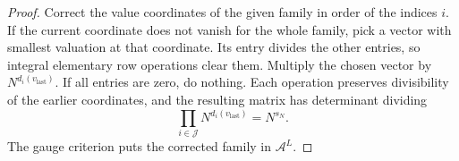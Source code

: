 \begin{proof}
Correct the value coordinates of the given family in order of the indices $i$. If the current coordinate does not vanish for the whole family, pick a vector with smallest valuation at that coordinate. Its entry divides the other entries, so integral elementary row operations clear them. Multiply the chosen vector by $N^{d_i(v_{\mathrm{last}})}$. If all entries are zero, do nothing. Each operation preserves divisibility of the earlier coordinates, and the resulting matrix has determinant dividing
\[
 \prod_{i\in\mathcal J} N^{d_i(v_{\mathrm{last}})}=N^{s_N}.
\]
The gauge criterion puts the corrected family in $\mathcal A^L$.
\end{proof}

